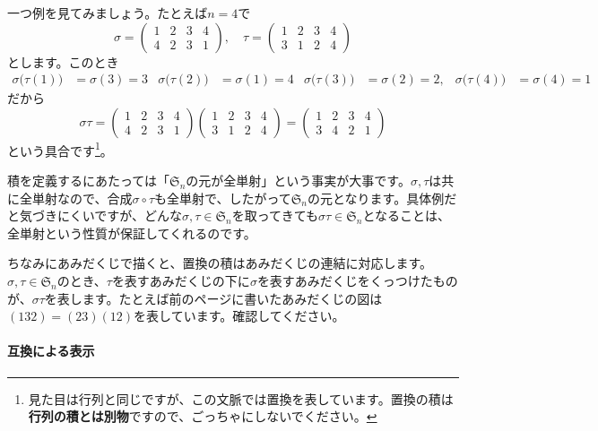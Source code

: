 一つ例を見てみましょう。たとえば$n = 4$で
\[
\sigma = 
\begin{pmatrix}
1 & 2 & 3 & 4 \\
4 & 2 & 3 & 1
\end{pmatrix}, \quad
\tau = 
\begin{pmatrix}
1 & 2 & 3 & 4 \\
3 & 1 & 2 & 4
\end{pmatrix}
\]
とします。このとき
\begin{align*}
\sigma\bigl(\tau(1)\bigr) &= \sigma(3) = 3 &\sigma\bigl(\tau(2)\bigr) &= \sigma(1) = 4 &\sigma\bigl(\tau(3)\bigr) &= \sigma(2) = 2,
&\sigma\bigl(\tau(4)\bigr) &= \sigma(4) = 1
\end{align*}
だから
\[
\sigma \tau =
\begin{pmatrix}
1 & 2 & 3 & 4 \\
4 & 2 & 3 & 1
\end{pmatrix}
\begin{pmatrix}
1 & 2 & 3 & 4 \\
3 & 1 & 2 & 4
\end{pmatrix}
=
\begin{pmatrix}
1 & 2 & 3 & 4 \\
3 & 4 & 2 & 1
\end{pmatrix}
\]
という具合です\footnote{見た目は行列と同じですが、この文脈では置換を表しています。置換の積は\textbf{行列の積とは別物}ですので、ごっちゃにしないでください。}。

積を定義するにあたっては「$\mathfrak{S}_n$の元が全単射」という事実が大事です。$\sigma, \tau$は共に全単射なので、合成$\sigma \circ \tau$も全単射で、したがって$\mathfrak{S}_n$の元となります。具体例だと気づきにくいですが、どんな$\sigma, \tau \in \mathfrak{S}_n$を取ってきても$\sigma\tau \in \mathfrak{S}_n$となることは、全単射という性質が保証してくれるのです。

ちなみにあみだくじで描くと、置換の積はあみだくじの連結に対応します。$\sigma, \tau \in \mathfrak{S}_n$のとき、$\tau$を表すあみだくじの下に$\sigma$を表すあみだくじをくっつけたものが、$\sigma\tau$を表します。たとえば前のページに書いたあみだくじの図は$(132) = (23)(12)$を表しています。確認してください。

\paragraph{互換による表示}

